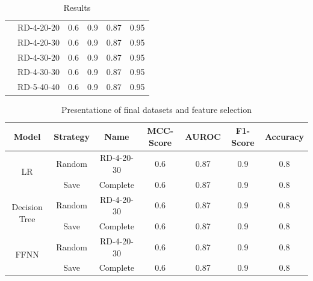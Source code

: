\begin{table}[ht]
\begin{tabular}{c c c c c c}
                                        & RD-4-20-20 & 0.6             & 0.9         & 0.87     & 0.95     \\
                                        & RD-4-20-30 & 0.6             & 0.9         & 0.87     & 0.95     \\
                                        & RD-4-30-20 & 0.6             & 0.9         & 0.87     & 0.95     \\
                                        & RD-4-30-30 & 0.6             & 0.9         & 0.87     & 0.95     \\
                                        & RD-5-40-40 & 0.6             & 0.9         & 0.87     & 0.95     \\
        \bottomrule
    \end{tabular}
    \caption{Results}
    \label{tab:dataset_model_selection_randomStrategy}
\end{table}


\begin{table}[ht]
    \centering
    \begin{tabular}{c c c c c c c}
        \toprule
        Model                          & Strategy & Name       & \gls{MCC}-Score & \gls{AUROC} & F1-Score & Accuracy \\
        \midrule
        \multirow{2}{*}{\gls{LR}}      & Random   & RD-4-20-30 & 0.6             & 0.87        & 0.9      & 0.8      \\
                                       & Save     & Complete   & 0.6             & 0.87        & 0.9      & 0.8      \\
        \midrule
        \multirow{2}{*}{Decision Tree} & Random   & RD-4-20-30 & 0.6             & 0.87        & 0.9      & 0.8      \\
                                       & Save     & Complete   & 0.6             & 0.87        & 0.9      & 0.8      \\
        \midrule
        \multirow{2}{*}{\gls{FFNN}}    & Random   & RD-4-20-30 & 0.6             & 0.87        & 0.9      & 0.8      \\
                                       & Save     & Complete   & 0.6             & 0.87        & 0.9      & 0.8      \\

        \bottomrule
    \end{tabular}
    \caption{Presentatione of final datasets and feature selection}
    \label{tab:final_dataset_features}
\end{table}
\clearpage


